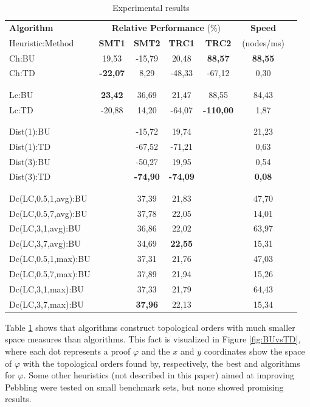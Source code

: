 \documentclass{llncs}
\begin{document}
\newcommand{\cHline}{\\[-2.5ex] \hline \\[-2.5ex]}
\begin{table}[tb]
\centering
\setlength{\tabcolsep}{8pt}
\begin{tabular}{|l|c|c|c|c|c|c}
\hline
\textbf{Algorithm} & \multicolumn{4}{c|}{\textbf{Relative Performance} (\%)} & \textbf{Speed}\\ 
Heuristic:Method & \textbf{SMT1} & \textbf{SMT2} & \textbf{TRC1} & \textbf{TRC2} & (nodes/ms)\\ 
\hline\hline
Ch:BU & 19,53 & -15,79 & 20,48 & \textbf{88,57} & \textbf{88,55} \\ 
Ch:TD & \textbf{-22,07} & 8,29 & -48,33 & -67,12 & 0,30 \\ \cHline
Lc:BU & \textbf{23,42}& 36,69 & 21,47 & 88,55 & 84,43 \\ 
Lc:TD & -20,88 & 14,20 & -64,07 & \textbf{-110,00} & 1,87 \\ \cHline
Dist(1):BU & & -15,72 & 19,74 & & 21,23 \\ 
Dist(1):TD & & -67,52 & -71,21 & & 0,63 \\ 
Dist(3):BU & & -50,27 & 19,95 & & 0,54\\ 
Dist(3):TD & & \textbf{-74,90} & \textbf{-74,09} & & \textbf{0,08}\\ \cHline
Dc(LC,0.5,1,avg):BU & & 37,39 & 21,83 & & 47,70\\ 
Dc(LC,0.5,7,avg):BU & & 37,78 & 22,05 & & 14,01 \\
Dc(LC,3,1,avg):BU & & 36,86 & 22,02 & & 63,97\\
Dc(LC,3,7,avg):BU & & 34,69 & \textbf{22,55} & & 15,31 \\ 
Dc(LC,0.5,1,max):BU & & 37,31 & 21,76 & & 47,03 \\
Dc(LC,0.5,7,max):BU & & 37,89 & 21,94 & & 15,26 \\
Dc(LC,3,1,max):BU & & 37,33 & 21,79 & & 64,43 \\
Dc(LC,3,7,max):BU & & \textbf{37,96} & 22,13 & & 15,34 \\
\hline
\end{tabular}
\caption{Experimental results}
\label{tab:results}
\end{table}

\noindent
Table \ref{tab:results} shows that  algorithms construct topological orders with much smaller space measures than  algorithms. This fact is visualized in Figure \ref{fig:BUvsTD}, where each dot represents a proof $\varphi$ and the $x$ and $y$ coordinates show the space of $\varphi$ with the topological orders found by, respectively, the best  and  algorithms for $\varphi$. Some other heuristics (not described in this paper) aimed at improving  Pebbling were tested on small benchmark sets, but none showed promising results.
\end{document}
